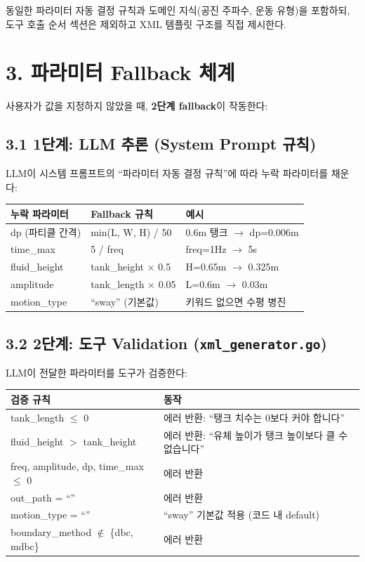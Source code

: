 \documentclass[10pt,a4paper]{article}
\begin{document}
동일한 파라미터 자동 결정 규칙과 도메인 지식(공진 주파수, 운동 유형)을 포함하되, 도구 호출 순서 섹션은 제외하고 XML 템플릿 구조를 직접 제시한다.

\section{3. 파라미터 Fallback 체계}

사용자가 값을 지정하지 않았을 때, \textbf{2단계 fallback}이 작동한다:

\subsection{3.1 1단계: LLM 추론 (System Prompt 규칙)}

LLM이 시스템 프롬프트의 ``파라미터 자동 결정 규칙''에 따라 누락 파라미터를 채운다:

\begin{center}
\small
\begin{tabular}{lll}
\toprule
\textbf{누락 파라미터} & \textbf{Fallback 규칙} & \textbf{예시} \\
\midrule
dp (파티클 간격) & min(L, W, H) / 50 & 0.6m 탱크 $\rightarrow$ dp=0.006m \\
time\_max & 5 / freq & freq=1Hz $\rightarrow$ 5s \\
fluid\_height & tank\_height $\times$ 0.5 & H=0.65m $\rightarrow$ 0.325m \\
amplitude & tank\_length $\times$ 0.05 & L=0.6m $\rightarrow$ 0.03m \\
motion\_type & ``sway'' (기본값) & 키워드 없으면 수평 병진 \\
\bottomrule
\end{tabular}
\end{center}

\subsection{3.2 2단계: 도구 Validation (\texttt{xml\_generator.go})}

LLM이 전달한 파라미터를 도구가 검증한다:

\begin{center}
\small
\begin{tabular}{ll}
\toprule
\textbf{검증 규칙} & \textbf{동작} \\
\midrule
tank\_length $\leq$ 0 & 에러 반환: ``탱크 치수는 0보다 커야 합니다'' \\
fluid\_height $>$ tank\_height & 에러 반환: ``유체 높이가 탱크 높이보다 클 수 없습니다'' \\
freq, amplitude, dp, time\_max $\leq$ 0 & 에러 반환 \\
out\_path = ``'' & 에러 반환 \\
motion\_type = ``'' & ``sway'' 기본값 적용 (코드 내 default) \\
boundary\_method $\notin$ \{dbc, mdbc\} & 에러 반환 \\
\bottomrule
\end{tabular}
\end{center}
\end{document}
